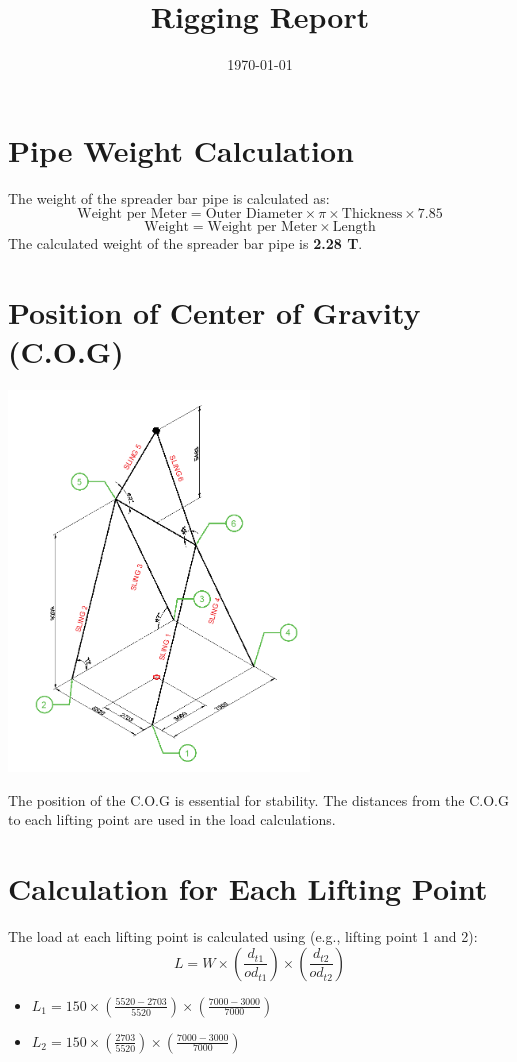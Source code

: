 \documentclass[12pt]{article}
\title{Rigging Report}
\author{}
\date{\today}
\begin{document}
\maketitle

\section{Pipe Weight Calculation}
The weight of the spreader bar pipe is calculated as:
\[
\text{Weight per Meter} = \text{Outer Diameter} \times \pi \times \text{Thickness} \times 7.85
\]
\[
\text{Weight} = \text{Weight per Meter} \times \text{Length}
\]
The calculated weight of the spreader bar pipe is \textbf{2.28 T}.

\section{Position of Center of Gravity (C.O.G)}
\begin{center}
\includegraphics[width=0.6\textwidth]{image-3.png}
\end{center}
The position of the C.O.G is essential for stability. The distances from the C.O.G to each lifting point are used in the load calculations.

\section{Calculation for Each Lifting Point}
The load at each lifting point is calculated using (e.g., lifting point 1 and 2):
\[
L = W \times \left( \frac{d_{t1}}{od_{t1}} \right) \times \left( \frac{d_{t2}}{od_{t2}} \right)
\]
\begin{itemize}
  \item $L_1 = 150 \times \left( \frac{5520-2703}{5520} \right) \times \left( \frac{7000-3000}{7000} \right)$
  \item $L_2 = 150 \times \left( \frac{2703}{5520} \right) \times \left( \frac{7000-3000}{7000} \right)$
\end{itemize}
\end{document}
